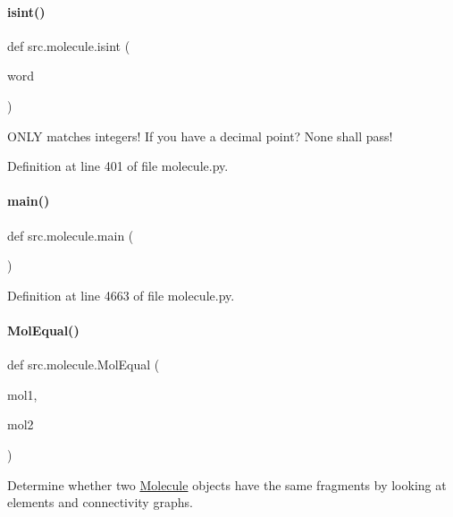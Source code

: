 \paragraph{\texorpdfstring{isint()}{isint()}}
{\footnotesize\ttfamily def src.\+molecule.\+isint (\begin{DoxyParamCaption}\item[{}]{word }\end{DoxyParamCaption})}



O\+N\+LY matches integers! If you have a decimal point? None shall pass! 



Definition at line 401 of file molecule.\+py.

\mbox{\label{namespacesrc_1_1molecule_a596a9d60dc2ba03cd91633d0689620d6}} 
\paragraph{\texorpdfstring{main()}{main()}}
{\footnotesize\ttfamily def src.\+molecule.\+main (\begin{DoxyParamCaption}{ }\end{DoxyParamCaption})}



Definition at line 4663 of file molecule.\+py.

\mbox{\label{namespacesrc_1_1molecule_a6b9b3403d57a07cf94d7a47a73e67da8}} 
\paragraph{\texorpdfstring{Mol\+Equal()}{MolEqual()}}
{\footnotesize\ttfamily def src.\+molecule.\+Mol\+Equal (\begin{DoxyParamCaption}\item[{}]{mol1,  }\item[{}]{mol2 }\end{DoxyParamCaption})}



Determine whether two \hyperlink{classsrc_1_1molecule_1_1Molecule}{Molecule} objects have the same fragments by looking at elements and connectivity graphs. 


